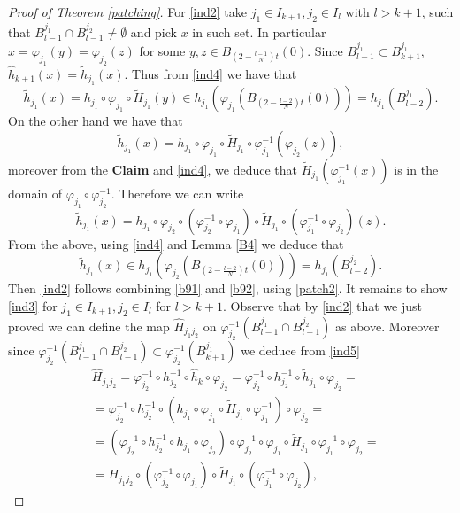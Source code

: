 \documentclass[11pt]{article}
\renewcommand{\phi}{\varphi}
\theoremstyle{plain}
\theoremstyle{definition}
\numberwithin{equation}{section}
\begin{document}
\begin{proof}[Proof of Theorem \ref{patching}]
	
	For \eqref{ind2}  take $j_1 \in I_{k+1}, j_2 \in I_{l}$ with $l>k+1$, such that $B_{l-1}^{j_1} \cap B_{l-1}^{j_2}\neq \emptyset$ and pick $x$ in such set. In particular $x=\phi_{j_1}(y)=\phi_{j_2}(z)$ for some $y,z \in B_{(2-\frac{l-1}{N})t}(0)$. Since $B_{l-1}^{j_1} \subset B_{k+1}^{j_1}$, $\hat h_{k+1}(x)=\tilde h_{j_1}(x)$. Thus from \eqref{ind4} we have that
	\begin{equation}\label{b91}
		\tilde h_{j_1}(x)=h_{j_{1}} \circ \phi_{j_{1}}\circ \tilde H_{j_{1}}(y) \in h_{j_{1}}(\phi_{j_{1}}(B_{(2-\frac{l-2}{N})t}(0)))= h_{j_{1}} (B^{j_1}_{l-2}).
	\end{equation}
	On the other hand we have that
	\[\tilde h_{j_1}(x)= h_{j_{1}} \circ \phi_{j_{1}}\circ \tilde H_{j_{1}} \circ \phi_{j_{1}}^{-1}(\phi_{j_2}(z)),\]
	moreover from the \textbf{Claim} and \eqref{ind4}, we deduce that $\tilde H_{j_{1}}(\phi_{j_{1}}^{-1}(x))$ is in the domain of $\phi_{j_{1}} \circ \phi_{j_{2}}^{-1}$. Therefore we can write 
	\[\tilde h_{j_1}(x)= h_{j_{1}}  \circ \phi_{j_{2}} \circ (\phi_{j_{2}}^{-1} \circ \phi_{j_{1}})\circ \tilde H_{j_{1}} \circ (\phi_{j_{1}}^{-1} \circ \phi_{j_2})(z).
	\]
	From the above, using \eqref{ind4} and Lemma \ref{B4} we deduce that
	\begin{equation}\label{b92}
		\tilde h_{j_1}(x)\in h_{j_{1}}(\phi_{j_{2}}(B_{(2-\frac{l-2}{N})t}(0)))= h_{j_{1}} (B^{j_2}_{l-2}).
	\end{equation}
	Then \eqref{ind2} follows combining \eqref{b91} and \eqref{b92}, using \eqref{patch2}. It remains to show \eqref{ind3} for $j_1 \in I_{k+1}, j_2 \in I_{l}$ for $l> k+1.$ Observe that by \eqref{ind2} that we just proved we can define the map  $\hat H_{j_1j_2}$ on $\phi_{j_2}^{-1}(B_{l-1}^{j_1} \cap B_{l-1}^{j_2} )$ as above. Moreover since $\phi_{j_2}^{-1}(B_{l-1}^{j_1} \cap B_{l-1}^{j_2} )\subset \phi_{j_2}^{-1}(B_{k+1}^{j_1})$ we deduce from \eqref{ind5}
	\begin{align*}
		&\hat H_{j_1j_2}=\phi_{j_2}^{-1}\circ h_{j_2}^{-1}\circ \hat h_{k} \circ \phi_{j_2}=\phi_{j_2}^{-1}\circ h_{j_2}^{-1}\circ \tilde h_{j_1} \circ \phi_{j_2}=\\
		&=\phi_{j_2}^{-1}\circ h_{j_2}^{-1}\circ ( h_{j_1}\circ \phi_{j_1} \circ \tilde H_{j_1} \circ \phi_{j_1}^{-1})  \circ \phi_{j_2}=\\
		&=(\phi_{j_2}^{-1}\circ h_{j_2}^{-1}\circ  h_{j_1} \circ \phi_{j_2}) \circ \phi_{j_2}^{-1} \circ \phi_{j_1}\circ \tilde H_{j_1} \circ \phi_{j_1}^{-1} \circ \phi_{j_2}=\\
		&=H_{j_1j_2} \circ (\phi_{j_2}^{-1} \circ \phi_{j_1})\circ  \tilde H_{j_1} \circ (\phi_{j_1}^{-1} \circ \phi_{j_2}),

\end{align*}
\end{proof}
\end{document}
